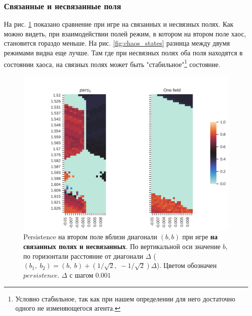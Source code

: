 \documentclass[12pt]{article}
\begin{document}
        \subsubsection{Связанные и несвязанные поля}
        На рис. \ref{fig:chaos_compare} показано сравнение при игре на связанных и несвязных полях. Как можно видеть, при взаимодействии полей режим, в котором на втором поле хаос, становится гораздо меньше.
        На рис. \ref{fig:chaos_states} разница между двумя режимами видна еще лучше. Там где при несвязных полях оба поля находятся в состоянии хаоса, на связных полях может быть "стабильное"\footnote{Условно стабильное, так как при нашем определении для него достаточно одного не изменяющегося агента.} состояние.
        \begin{figure}[H]
            \centering
            \includegraphics[width=0.95\columnwidth, keepaspectratio=True]{DoubleField/double_field_comparison_pers.jpg}
            \caption{Persistence на втором поле вблизи диагонали $(b, b)$ при игре \textbf{на связанных полях и несвязанных}. По вертикальной оси значение $b$, по горизонтали расстояние от диагонали $\Delta$ ($(b_1,\;b_2) = (b,\;b) + (1/\sqrt{2},\;-1/\sqrt{2})\Delta$). Цветом обозначен $persistence$. $\Delta$ с шагом $0.001$}
            \label{fig:chaos_compare}
        \end{figure}
        
\end{document}
